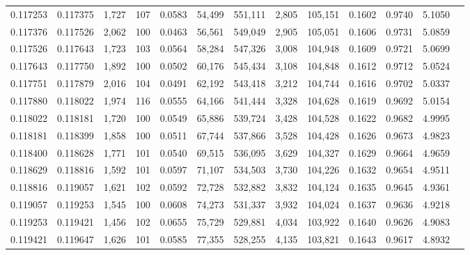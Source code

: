 \begin{tabular}{rrrrrrrrrrrrr}
0.117253 & 0.117375 & 1,727 & 107 &                                     0.0583 &  54,499 & 551,111 &   2,805 & 105,151 & 0.1602 & 0.9740 & 5.1050 \\
0.117376 & 0.117526 & 2,062 & 100 &                                     0.0463 &  56,561 & 549,049 &   2,905 & 105,051 & 0.1606 & 0.9731 & 5.0859 \\
0.117526 & 0.117643 & 1,723 & 103 &                                     0.0564 &  58,284 & 547,326 &   3,008 & 104,948 & 0.1609 & 0.9721 & 5.0699 \\
0.117643 & 0.117750 & 1,892 & 100 &                                     0.0502 &  60,176 & 545,434 &   3,108 & 104,848 & 0.1612 & 0.9712 & 5.0524 \\
0.117751 & 0.117879 & 2,016 & 104 &                                     0.0491 &  62,192 & 543,418 &   3,212 & 104,744 & 0.1616 & 0.9702 & 5.0337 \\
0.117880 & 0.118022 & 1,974 & 116 &                                     0.0555 &  64,166 & 541,444 &   3,328 & 104,628 & 0.1619 & 0.9692 & 5.0154 \\
0.118022 & 0.118181 & 1,720 & 100 &                                     0.0549 &  65,886 & 539,724 &   3,428 & 104,528 & 0.1622 & 0.9682 & 4.9995 \\
0.118181 & 0.118399 & 1,858 & 100 &                                     0.0511 &  67,744 & 537,866 &   3,528 & 104,428 & 0.1626 & 0.9673 & 4.9823 \\
0.118400 & 0.118628 & 1,771 & 101 &                                     0.0540 &  69,515 & 536,095 &   3,629 & 104,327 & 0.1629 & 0.9664 & 4.9659 \\
0.118629 & 0.118816 & 1,592 & 101 &                                     0.0597 &  71,107 & 534,503 &   3,730 & 104,226 & 0.1632 & 0.9654 & 4.9511 \\
0.118816 & 0.119057 & 1,621 & 102 &                                     0.0592 &  72,728 & 532,882 &   3,832 & 104,124 & 0.1635 & 0.9645 & 4.9361 \\
0.119057 & 0.119253 & 1,545 & 100 &                                     0.0608 &  74,273 & 531,337 &   3,932 & 104,024 & 0.1637 & 0.9636 & 4.9218 \\
0.119253 & 0.119421 & 1,456 & 102 &                                     0.0655 &  75,729 & 529,881 &   4,034 & 103,922 & 0.1640 & 0.9626 & 4.9083 \\
0.119421 & 0.119647 & 1,626 & 101 &                                     0.0585 &  77,355 & 528,255 &   4,135 & 103,821 & 0.1643 & 0.9617 & 4.8932 \\

\end{tabular}
